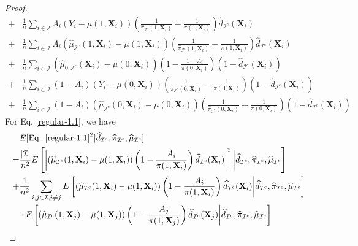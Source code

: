 \documentclass[11pt]{article}
\theoremstyle{referenceplain}
\theoremstyle{referencedefinition}
\theoremstyle{referenceremark}
\begin{document}
\begin{proof}
\begin{align}
        +&\frac{1}{n}\sum_{i\in\mathcal{I}}A_i\left(Y_i-\mu(1,\mathbf{X}_i)\right)\left(\frac{1}{\widehat{\pi}_{\mathcal{I}^c}(1,\mathbf{X}_i)}-\frac{1}{\pi(1,\mathbf{X}_i)}\right)\widehat{d}_{\mathcal{I}^c}(\mathbf{X}_i)\label{regular-1.2}\\
        +&\frac{1}{n}\sum_{i\in\mathcal{I}}A_i\left(\widehat{\mu}_{\mathcal{I}^c}(1,\mathbf{X}_i)-\mu(1,\mathbf{X}_i)\right)\left(\frac{1}{\widehat{\pi}_{\mathcal{I}^c}(1,\mathbf{X}_i)}-\frac{1}{\pi(1,\mathbf{X}_i)}\right)\widehat{d}_{\mathcal{I}^c}(\mathbf{X}_i)\label{regular-1.3}\\
        +&\frac{1}{n}\sum_{i\in\mathcal{I}}\left(\widehat{\mu}_{0,\mathcal{I}^c}(\mathbf{X}_i)-\mu(0,\mathbf{X}_i)\right)\left(1-\frac{1-A_i}{\pi(0,\mathbf{X}_i)}\right)\left(1-\widehat{d}_{\mathcal{I}^c}(\mathbf{X}_i)\right)\label{regular-1.4}\\
        +&\frac{1}{n}\sum_{i\in\mathcal{I}}(1-A_i)\left(Y_i-\mu(0,\mathbf{X}_i)\right)\left(\frac{1}{\widehat{\pi}_{\mathcal{I}^c}(0,\mathbf{X}_i)}-\frac{1}{\pi(0,\mathbf{X}_i)}\right)\left(1-\widehat{d}_{\mathcal{I}^c}(\mathbf{X}_i)\right)\label{regular-1.5}\\
        +&\frac{1}{n}\sum_{i\in\mathcal{I}}(1-A_i)\left(\widehat{\mu}_{\mathcal{I}^c}(0,\mathbf{X}_i)-\mu(0,\mathbf{X}_i)\right)\left(\frac{1}{\widehat{\pi}_{\mathcal{I}^c}(0,\mathbf{X}_i)}-\frac{1}{\pi(0,\mathbf{X}_i)}\right)\left(1-\widehat{d}_{\mathcal{I}^c}(\mathbf{X}_i)\right).\label{regular-1.6}
    \end{align}
    For Eq. \eqref{regular-1.1}, we have
    \begin{align*}
       & E[\text{Eq. }\eqref{regular-1.1}^2|\widehat{d}_{\mathcal{I}^c}, \widehat{\pi}_{\mathcal{I}^c}, \widehat{\mu}_{\mathcal{I}^c}]\\
       =&\frac{|\mathcal{I}|}{n^2} E\left[\left|\left(\widehat{\mu}_{\mathcal{I}^c}(1,\mathbf{X}_i)-\mu(1,\mathbf{X}_i)\right)\left(1-\frac{A_i}{\pi(1,\mathbf{X}_i)}\right)\widehat{d}_{\mathcal{I}^c}(\mathbf{X}_i)\right|^2\bigg|\widehat{d}_{\mathcal{I}^c}, \widehat{\pi}_{\mathcal{I}^c}, \widehat{\mu}_{\mathcal{I}^c}\right]\\
       +&\frac{1}{n^2}\sum_{i,j\in\mathcal{I},i\neq j}E\left[\left(\widehat{\mu}_{\mathcal{I}^c}(1,\mathbf{X}_i)-\mu(1,\mathbf{X}_i)\right)\left(1-\frac{A_i}{\pi(1,\mathbf{X}_i)}\right)\widehat{d}_{\mathcal{I}^c}(\mathbf{X}_i)\bigg|\widehat{d}_{\mathcal{I}^c}, \widehat{\pi}_{\mathcal{I}^c}, \widehat{\mu}_{\mathcal{I}^c}\right]\\
       &\cdot E\left[\left(\widehat{\mu}_{\mathcal{I}^c}(1,\mathbf{X}_j)-\mu(1,\mathbf{X}_j)\right)\left(1-\frac{A_j}{\pi(1,\mathbf{X}_j)}\right)\widehat{d}_{\mathcal{I}^c}(\mathbf{X}_j)\bigg|\widehat{d}_{\mathcal{I}^c}, \widehat{\pi}_{\mathcal{I}^c}, \widehat{\mu}_{\mathcal{I}^c}\right]\\

\end{align*}
\end{proof}
\end{document}
